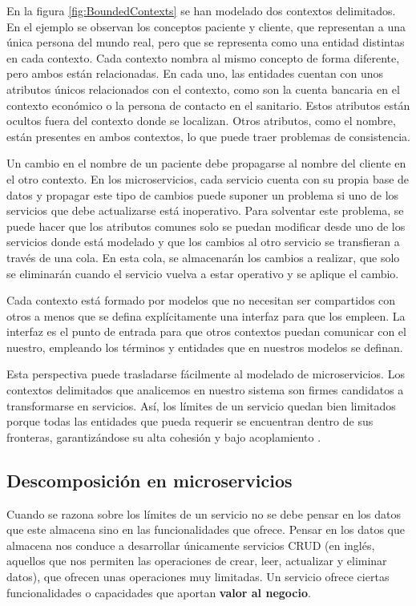 \documentclass[11pt,spanish,listoffigures]{tfgetsinf}
\begin{document}
En la figura \ref{fig:BoundedContexts} se han modelado dos contextos delimitados. En el ejemplo se observan los conceptos paciente y cliente, que representan a una única persona del mundo real, pero que se representa como una entidad distintas en cada contexto. Cada contexto nombra al mismo concepto de forma diferente, pero ambos están relacionadas. En cada uno, las entidades cuentan con unos atributos únicos relacionados con el contexto, como son la cuenta bancaria en el contexto económico o la persona de contacto en el sanitario. Estos atributos están ocultos fuera del contexto donde se localizan. Otros atributos, como el nombre, están presentes en ambos contextos, lo que puede traer problemas de consistencia. 

Un cambio en el nombre de un paciente debe propagarse al nombre del cliente en el otro contexto. En los microservicios, cada servicio cuenta con su propia base de datos y propagar este tipo de cambios puede suponer un problema si uno de los servicios que debe actualizarse está inoperativo. Para solventar este problema, se puede hacer que los atributos comunes solo se puedan modificar desde uno de los servicios donde está modelado y que los cambios al otro servicio se transfieran a través de una cola. En esta cola, se almacenarán los cambios a realizar, que solo se eliminarán cuando el servicio vuelva a estar operativo y se aplique el cambio.

Cada contexto está formado por modelos que no necesitan ser compartidos con otros a menos que se defina explícitamente una interfaz para que los empleen. La interfaz es el punto de entrada para que otros contextos puedan comunicar con el nuestro, empleando los términos y entidades que en nuestros modelos se definan.

Esta perspectiva puede trasladarse fácilmente al modelado de microservicios. Los contextos delimitados que analicemos en nuestro sistema son firmes candidatos a transformarse en servicios. Así, los límites de un servicio quedan bien limitados porque  todas las entidades que pueda requerir se encuentran dentro de sus fronteras, garantizándose su alta cohesión y bajo acoplamiento \cite{Newman2015a}.

\subsection{Descomposición en microservicios} \label{subsect:Descomposicion}

Cuando se razona sobre los límites de un servicio no se debe pensar en los datos que este almacena sino en las funcionalidades que ofrece. Pensar en los datos que almacena nos conduce a desarrollar únicamente servicios CRUD (en inglés, aquellos que nos permiten las operaciones de crear, leer, actualizar y eliminar datos), que ofrecen unas operaciones muy limitadas. Un servicio ofrece ciertas funcionalidades o capacidades que aportan \textbf{valor al negocio}.
\end{document}

